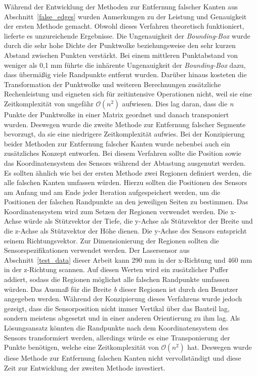 Während der Entwicklung der Methoden zur Entfernung falscher Kanten aus Abschnitt~\ref{false_edges} wurden Anmerkungen zu der Leistung und Genauigkeit der ersten Methode gemacht. Obwohl dieses Verfahren theoretisch funktioniert, lieferte es unzureichende Ergebnisse. Die Ungenauigkeit der \textit{Bounding-Box} wurde durch die sehr hohe Dichte der Punktwolke beziehungsweise den sehr kurzen Abstand zwischen Punkten verstärkt. Bei einem mittleren Punktabstand von weniger als 0,1 mm führte die inhärente Ungenauigkeit der \textit{Bounding-Box} dazu, dass übermäßig viele Randpunkte entfernt wurden. Darüber hinaus kosteten die Transformation der Punktwolke und weiteren Berechnungen zusätzliche Rechenleistung und eigneten sich für zeitintensive Operationen nicht, weil sie eine Zeitkomplexität von ungefähr $\mathcal{O}(n^2)$ aufwiesen. Dies lag daran, dass die \textit{n} Punkte der Punktwolke in einer Matrix geordnet und danach transponiert wurden. Deswegen wurde die zweite Methode zur Entfernung falscher Segmente bevorzugt, da sie eine niedrigere Zeitkomplexität aufwies. Bei der Konzipierung beider Methoden zur Entfernung falscher Kanten wurde nebenbei auch ein zusätzliches Konzept entworfen. Bei diesem Verfahren sollte die Position sowie das Koordinatensystem des Sensors während der Abtastung ausgenutzt werden. Es sollten ähnlich wie bei der ersten Methode zwei Regionen definiert werden, die alle falschen Kanten umfassen würden. Hierzu sollten die Positionen des Sensors am Anfang und am Ende jeder Iteration aufgespeichert werden, um die Positionen der falschen Randpunkte an den jeweiligen Seiten zu bestimmen. Das Koordinatensystem wird zum Setzen der Regionen verwendet werden. Die x-Achse würde als Stützvektor der Tiefe, die y-Achse als Stützvektor der Breite und die z-Achse als Stützvektor der Höhe dienen. Die y-Achse des Sensors entspricht seinem Richtungsvektor. Zur Dimensionierung der Regionen sollten die Sensorspezifikationen verwendet werden. Der Lasersensor aus Abschnitt~\ref{test_data} dieser Arbeit kann 290 mm in der x-Richtung und 460 mm in der z-Richtung scannen. Auf diesen Werten wird ein zusätzlicher Puffer addiert, sodass die Regionen möglichst alle falschen Randpunkte umfassen würden. Das Ausmaß für die Breite \textit{b} dieser Regionen ist durch den Benutzer angegeben werden. Während der Konzipierung dieses Verfahrens wurde jedoch gezeigt, dass die Sensorposition nicht immer Vertikal über das Bauteil lag, sondern meistens abgesetzt und in einer anderen Orientierung zu ihm lag. Als Lösungsansatz könnten die Randpunkte nach dem Koordinatensystem des Sensors transformiert werden, allerdings würde es eine Transponierung der Punkte benötigen, welche eine Zeitkomplexität von $\mathcal{O}(n^2)$ hat. Deswegen wurde diese Methode zur Entfernung falschen Kanten nicht vervollständigt und diese Zeit zur Entwicklung der zweiten Methode investiert. 

